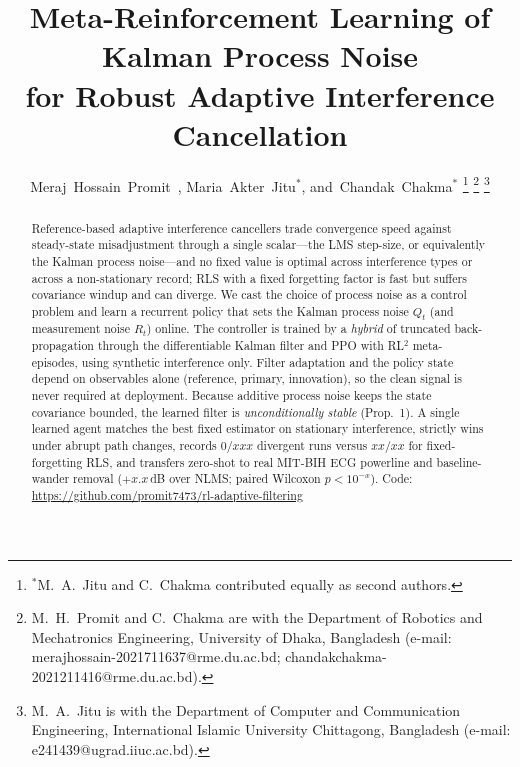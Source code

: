 \documentclass[journal]{IEEEtran}
\newcommand{\pend}[1]{\textcolor{pendingorange}{#1}}
\begin{document}
\title{Meta-Reinforcement Learning of Kalman Process Noise\\
       for Robust Adaptive Interference Cancellation}

\author{Meraj~Hossain~Promit~,
        Maria~Akter~Jitu$^{*}$,
        and~Chandak~Chakma$^{*}$%
\thanks{$^{*}$M.~A.~Jitu and C.~Chakma contributed equally as second authors.}%
\thanks{M.~H.~Promit and C.~Chakma are with the Department of Robotics and
Mechatronics Engineering, University of Dhaka, Bangladesh
(e-mail: merajhossain-2021711637@rme.du.ac.bd;
chandakchakma-2021211416@rme.du.ac.bd).}%
\thanks{M.~A.~Jitu is with the Department of Computer and Communication
Engineering, International Islamic University Chittagong, Bangladesh
(e-mail: e241439@ugrad.iiuc.ac.bd).}%
}

\maketitle

\begin{abstract}
Reference-based adaptive interference cancellers trade convergence speed
against steady-state misadjustment through a single scalar---the LMS
step-size, or equivalently the Kalman process noise---and no fixed value is
optimal across interference types or across a non-stationary record; RLS with
a fixed forgetting factor is fast but suffers covariance windup and can
diverge. We cast the choice of process noise as a control problem and learn a
recurrent policy that sets the Kalman process noise $Q_t$ (and measurement
noise $R_t$) online. The controller is trained by a \emph{hybrid} of truncated
back-propagation through the differentiable Kalman filter and PPO with
RL$^2$ meta-episodes, using synthetic interference only. Filter adaptation and
the policy state depend on observables alone (reference, primary, innovation),
so the clean signal is never required at deployment. Because additive process
noise keeps the state covariance bounded, the learned filter is
\emph{unconditionally stable} (Prop.~1). A single learned agent
matches the best fixed estimator on stationary interference, strictly wins
under abrupt path changes, records \pend{$0/xxx$} divergent runs versus
\pend{$xx/xx$} for fixed-forgetting RLS, and transfers zero-shot to real
MIT-BIH ECG powerline and baseline-wander removal (\pend{$+x.x$}\,dB over NLMS;
paired Wilcoxon \pend{$p{<}10^{-x}$}).
Code: \url{https://github.com/promit7473/rl-adaptive-filtering}
\end{abstract}
\end{document}
